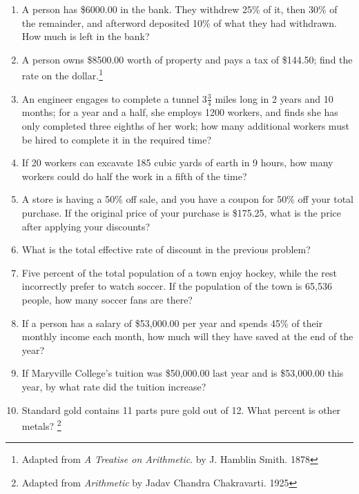 \documentclass{article}
\begin{document}
\begin{enumerate}
\item A person has \$6000.00 in the bank.  They withdrew 25\% of it, then 30\% of the remainder, and afterword deposited 10\% of what they had withdrawn. How much is left in the bank?\footnotemark[\ref{fn:higher}]

\item A person owns \$8500.00 worth of property and pays a tax of \$144.50; find the rate on the dollar.\footnote{Adapted from {\em A Treatise on Arithmetic}. by J. Hamblin Smith. 1878\label{fn:treatise}}

\item An engineer engages to complete a tunnel $3\frac{3}{4}$ miles long in 2 years and 10 months; for a year and a half, she employs 1200 workers, and finds she has only completed three eighths of her work; how many additional workers must be hired to complete it in the required time?\footnotemark[\ref{fn:treatise}]

\item If 20 workers can excavate 185 cubic yards of earth in 9 hours, how many workers could do half the work in a fifth of the time?\footnotemark[\ref{fn:treatise}]

\item A store is having a 50\% off sale, and you have a coupon for 50\% off your total purchase.  If the original price of your purchase is \$175.25, what is the price after applying your discounts?

\item What is the total effective rate of discount in the previous problem?

\item Five percent of the total population of a town 
enjoy hockey, while the rest incorrectly prefer to watch soccer.  If the population of the town is 65,536 people, how many soccer fans are there?

\item If a person has a salary of \$53,000.00 per year and spends 45\% of their monthly income each month, how much will they have
saved at the end of the year?

\item If Maryville College's tuition was \$50,000.00 last year and is \$53,000.00 this year, by what rate did the tuition increase?

\item Standard gold contains 11 parts pure gold out of 12.  What percent is other metals? \footnote{Adapted from {\em Arithmetic} by Jadav Chandra Chakravarti. 1925}

\end{enumerate}
\end{document}
